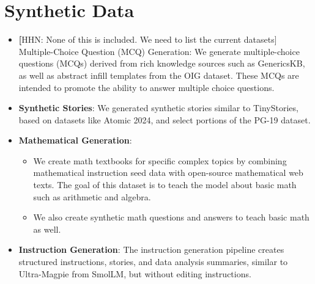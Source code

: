 \section{Synthetic Data}
\begin{itemize}
\item 

\textbf
[HHN: None of this is included. We need to list the current datasets]
{Multiple-Choice Question (MCQ) Generation}: We generate multiple-choice questions (MCQs) derived from rich knowledge sources such as GenericsKB, as well as abstract infill templates from the OIG dataset. These MCQs are intended to promote the ability to answer multiple choice questions. 

\item \textbf{Synthetic Stories}: We generated synthetic stories similar to TinyStories, based on datasets like Atomic 2024, and select portions of the PG-19 dataset. 

\item \textbf{Mathematical Generation}:
  \begin{itemize}
  \item We create math textbooks for specific complex topics by combining mathematical instruction seed data with open-source mathematical web texts. The goal of this dataset is to teach the model about basic math such as arithmetic and algebra. 
  \item We also create synthetic math questions and answers to teach basic math as well. 
  \end{itemize}

\item \textbf{Instruction Generation}: The instruction generation pipeline creates structured instructions, stories, and data analysis summaries, similar to Ultra-Magpie from SmolLM, but without editing instructions.
\end{itemize}

